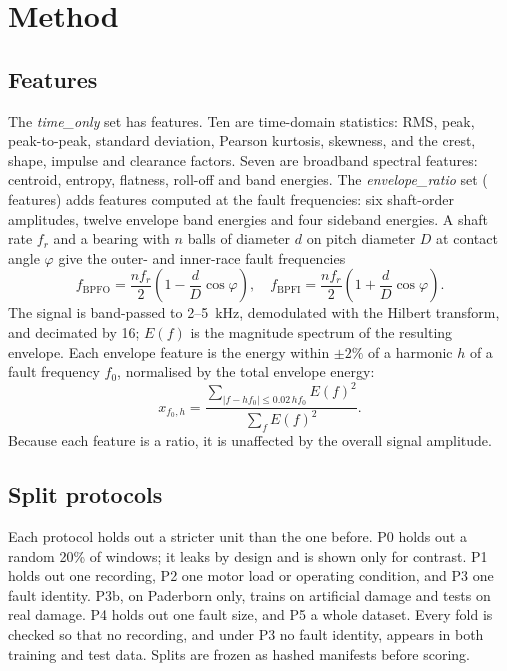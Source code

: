 \documentclass[conference,letterpaper]{IEEEtran}
\begin{document}
\section{Method}

\subsection{Features}

The \emph{time\_only} set has  features. Ten are time-domain statistics: RMS, peak, peak-to-peak,
standard deviation, Pearson kurtosis, skewness, and the crest, shape, impulse and clearance factors. Seven are
broadband spectral features: centroid, entropy, flatness, roll-off and band energies. The \emph{envelope\_ratio}
set ( features) adds features computed at the fault frequencies: six shaft-order
amplitudes, twelve envelope band energies and four sideband energies. A shaft rate $f_r$ and a bearing with $n$
balls of diameter $d$ on pitch diameter $D$ at contact angle $\varphi$ give the outer- and inner-race fault
frequencies
\begin{equation}
f_{\mathrm{BPFO}} = \frac{n f_r}{2}\left(1-\frac{d}{D}\cos\varphi\right),\quad
f_{\mathrm{BPFI}} = \frac{n f_r}{2}\left(1+\frac{d}{D}\cos\varphi\right).
\label{eq:bpf}
\end{equation}
The signal is band-passed to 2--5~kHz, demodulated with the Hilbert transform, and decimated by 16; $E(f)$ is
the magnitude spectrum of the resulting envelope. Each envelope feature is the energy within $\pm2\%$ of a
harmonic $h$ of a fault frequency $f_0$, normalised by the total envelope energy:
\begin{equation}
x_{f_0,h} = \frac{\sum_{|f-hf_0|\le 0.02\,hf_0} E(f)^2}{\sum_{f} E(f)^2}.
\label{eq:env}
\end{equation}
Because each feature is a ratio, it is unaffected by the overall signal amplitude.

\subsection{Split protocols}

Each protocol holds out a stricter unit than the one before. P0 holds out a random 20\% of windows; it leaks by
design and is shown only for contrast. P1 holds out one recording, P2 one motor load or operating condition, and
P3 one fault identity. P3b, on Paderborn only, trains on artificial damage and tests on real damage. P4 holds out
one fault size, and P5 a whole dataset. Every fold is checked so that no recording, and under P3 no fault
identity, appears in both training and test data. Splits are frozen as hashed manifests before scoring.
\end{document}
